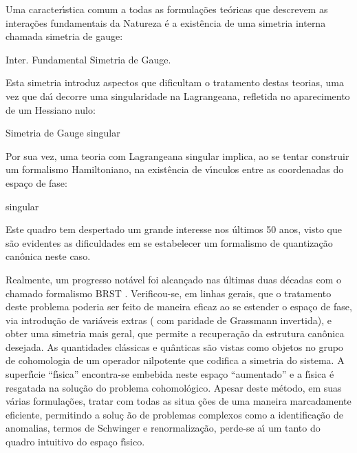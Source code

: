 \documentclass[a4paper,thmsa,12pt]{report}
\begin{document}
Uma caracter\'{\i}stica comum a todas as formula\c{c}\~{o}es te\'{o}ricas
que descrevem as intera\c{c}\~{o}es fundamentais da Natureza \'{e} a
exist\^{e}ncia de uma simetria interna chamada simetria de gauge:

\begin{center}
Inter. Fundamental \myHighlight{$~~\Longrightarrow~~$}\coordHE{} Simetria de Gauge.
\end{center}

\noindent Esta simetria introduz aspectos que dificultam o tratamento destas
teorias, uma vez que da\'{\i} decorre uma singularidade na Lagrangeana,
refletida no aparecimento de um Hessiano nulo:

\begin{center}
Simetria de Gauge \myHighlight{$~~\Longrightarrow~~$}\coordHE{}  \coordHE{} singular
\end{center}

\noindent Por sua vez, uma teoria com Lagrangeana singular implica, ao se
tentar construir um formalismo Hamiltoniano, na exist\^{e}ncia de
v\'{\i}nculos entre as coordenadas do espa\c{c}o de fase:

\begin{center}
\coordHE{} singular \myHighlight{$~~\Longrightarrow~~$}\coordHE{}  \coordHE{}
\end{center}

\noindent Este quadro tem despertado um grande interesse nos \'{u}ltimos 50
anos, visto que s\~{a}o evidentes as dificuldades em se estabelecer um
formalismo de quantiza\c{c}\~{a}o can\^{o}nica neste caso.

Realmente, um progresso not\'{a}vel foi alcan\c{c}ado nas \'{u}ltimas duas
d\'{e}cadas com o chamado formalismo BRST \cite{teitelboim}. Verificou-se,
em linhas gerais, que o tratamento deste problema poderia ser feito de
maneira eficaz ao se estender o espa\c{c}o de fase, via introdu\c{c}\~{a}o
de vari\'{a}veis extras ( com paridade de Grassmann invertida), e obter uma
simetria mais geral, que permite a recupera\c{c}\~{a}o da estrutura
can\^{o}nica desejada. As quantidades cl\'{a}ssicas e qu\^{a}nticas s\~{a}o
vistas como objetos no grupo de cohomologia de um operador nilpotente que
codifica a simetria do sistema. A superf\'{\i}cie ``f\'{\i}sica''
encontra-se embebida neste espa\c{c}o ``aumentado'' e a f\'{\i}sica \'{e}
resgatada na solu\c{c}\~{a}o do problema cohomol\'{o}gico. Apesar deste
m\'{e}todo, em suas v\'{a}rias formula\c{c}\~{o}es, tratar com todas as situa%
\c{c}\~{o}es de uma maneira marcadamente eficiente, permitindo a solu\c{c}%
\~{a}o de problemas complexos como a identifica\c{c}\~{a}o de anomalias,
termos de Schwinger e renormaliza\c{c}\~{a}o, perde-se a\'{\i} um tanto do
quadro intuitivo do espa\c{c}o f\'{\i}sico.
\end{document}
